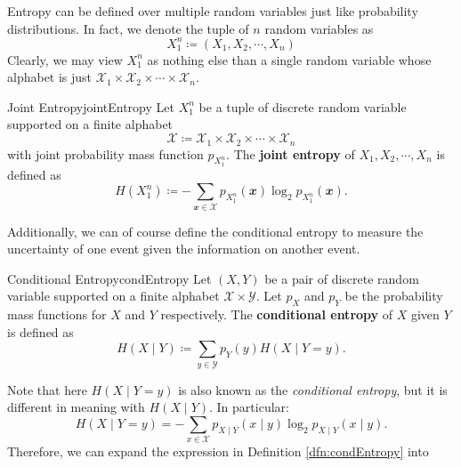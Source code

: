 \documentclass[math, code]{amznotes}
\theoremstyle{remark}
\begin{document}
Entropy can be defined over multiple random variables just like probability distributions. In fact, we denote the tuple of $n$ random variables as 
\begin{equation*}
    X_{1}^{n} \coloneqq \left(X_1, X_2, \cdots, X_n\right)
\end{equation*}
Clearly, we may view $X_1^n$ as nothing else than a single random variable whose alphabet is just $\mathcal{X}_1 \times \mathcal{X}_2 \times \cdots \times \mathcal{X}_n$.
\begin{dfnbox}{Joint Entropy}{jointEntropy}
    Let $X_1^n$ be a tuple of discrete random variable supported on a finite alphabet 
    \begin{equation*}
        \mathcal{X} \coloneqq \mathcal{X}_1 \times \mathcal{X}_2 \times \cdots \times \mathcal{X}_n
    \end{equation*}
    with joint probability mass function $p_{X_1^n}$. The {\color{red} \textbf{joint entropy}} of $X_1, X_2, \cdots, X_n$ is defined as 
    \begin{equation*}
        H\left(X_1^n\right) \coloneqq -\sum_{\mathbfit{x} \in \mathcal{X}}p_{X_1^n}\left(\mathbfit{x}\right)\log_{2}p_{X_1^n}\left(\mathbfit{x}\right).
    \end{equation*}
\end{dfnbox}
Additionally, we can of course define the conditional entropy to measure the uncertainty of one event given the information on another event.
\begin{dfnbox}{Conditional Entropy}{condEntropy}
    Let $\left(X, Y\right)$ be a pair of discrete random variable supported on a finite alphabet $\mathcal{X} \times \mathcal{Y}$. Let $p_X$ and $p_Y$ be the probability mass functions for $X$ and $Y$ respectively. The {\color{red} \textbf{conditional entropy}} of $X$ given $Y$ is defined as 
    \begin{equation*}
        H\left(X \mid Y\right) \coloneqq \sum_{y \in \mathcal{Y}}p_Y\left(y\right)H\left(X \mid Y = y\right).
    \end{equation*}
\end{dfnbox}
Note that here $H\left(X \mid Y = y\right)$ is also known as the \textit{conditional entropy}, but it is different in meaning with $H\left(X \mid Y\right)$. In particular:
\begin{equation*}
    H\left(X \mid Y = y\right) = -\sum_{x \in \mathcal{X}}p_{X \mid Y}\left(x \mid y\right)\log_2p_{X \mid Y}\left(x \mid y\right).
\end{equation*}
Therefore, we can expand the expression in Definition \ref{dfn:condEntropy} into
\end{document}
